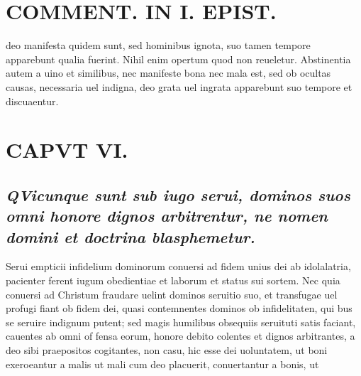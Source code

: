 \documentclass{article}
\begin{document}
\begin{pages}
\section*{COMMENT. IN I. EPIST. }
\marginpar{[ p.152 ]}\pstart deo manifesta quidem sunt, sed hominibus ignota, suo tamen tempore apparebunt qualia fuerint. Nihil enim opertum quod non reueletur. Abstinentia autem a uino et similibus, nec manifeste bona nec mala est, sed ob ocultas causas, necessaria uel indigna, deo grata uel ingrata apparebunt suo tempore et discuaentur.  \pend
\endnumbering\beginnumbering\section{CAPVT VI.}
{}
\subsection*{\textit{\huge\textbf{Q}\normalsize Vicunque sunt sub iugo serui, dominos suos omni honore dignos arbitrentur, ne nomen domini et doctrina blasphemetur. }}\pstart Serui empticii infidelium dominorum conuersi ad fidem unius dei ab idolalatria, pacienter ferent iugum obedientiae et laborum et status sui sortem. Nec quia conuersi ad Christum fraudare uelint dominos seruitio suo, et transfugae uel profugi fiant ob fidem dei, quasi contemnentes dominos ob infidelitaten, qui bus se seruire indignum putent; sed magis humilibus obsequiis seruituti satis faciant, cauentes ab omni of fensa eorum, honore debito colentes et dignos arbitrantes, a deo sibi praepositos cogitantes, non casu, hic esse dei uoluntatem, ut boni exeroeantur a malis ut mali cum deo placuerit, conuertantur a bonis, ut  \pend

\end{pages}
\end{document}
